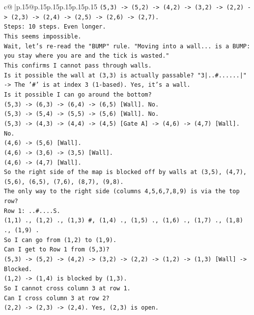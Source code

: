 \documentclass{article}
\begin{document}
{\begin{supertabular}{c@{$\;$}|p{.15\linewidth}@{}p{.15\linewidth}p{.15\linewidth}p{.15\linewidth}p{.15\linewidth}p{.15\linewidth}}
{{{\texttt{(5,3) {-}> (5,2) {-}> (4,2) {-}> (3,2) {-}> (2,2) {-}> (2,3) {-}> (2,4) {-}> (2,5) {-}> (2,6) {-}> (2,7).} \\
\texttt{Steps: 10 steps. Even longer.} \\
\texttt{This seems impossible.} \\
\texttt{Wait, let's re{-}read the "BUMP" rule. "Moving into a wall... is a BUMP: you stay where you are and the tick is wasted."} \\
\texttt{This confirms I cannot pass through walls.} \\
\texttt{Is it possible the wall at (3,3) is actually passable? "3|..\#......|" {-}> The '\#' is at index 3 (1{-}based). Yes, it's a wall.} \\
\texttt{Is it possible I can go around the bottom?} \\
\texttt{(5,3) {-}> (6,3) {-}> (6,4) {-}> (6,5) {[}Wall{]}. No.} \\
\texttt{(5,3) {-}> (5,4) {-}> (5,5) {-}> (5,6) {[}Wall{]}. No.} \\
\texttt{(5,3) {-}> (4,3) {-}> (4,4) {-}> (4,5) {[}Gate A{]} {-}> (4,6) {-}> (4,7) {[}Wall{]}. No.} \\
\texttt{(4,6) {-}> (5,6) {[}Wall{]}.} \\
\texttt{(4,6) {-}> (3,6) {-}> (3,5) {[}Wall{]}.} \\
\texttt{(4,6) {-}> (4,7) {[}Wall{]}.} \\
\texttt{So the right side of the map is blocked off by walls at (3,5), (4,7), (5,6), (6,5), (7,6), (8,7), (9,8).} \\
\texttt{The only way to the right side (columns 4,5,6,7,8,9) is via the top row?} \\
\texttt{Row 1: ..\#....S.} \\
\texttt{(1,1) ., (1,2) ., (1,3) \#, (1,4) ., (1,5) ., (1,6) ., (1,7) ., (1,8) ., (1,9) .} \\
\texttt{So I can go from (1,2) to (1,9).} \\
\texttt{Can I get to Row 1 from (5,3)?} \\
\texttt{(5,3) {-}> (5,2) {-}> (4,2) {-}> (3,2) {-}> (2,2) {-}> (1,2) {-}> (1,3) {[}Wall{]} {-}> Blocked.} \\
\texttt{(1,2) {-}> (1,4) is blocked by (1,3).} \\
\texttt{So I cannot cross column 3 at row 1.} \\
\texttt{Can I cross column 3 at row 2?} \\
\texttt{(2,2) {-}> (2,3) {-}> (2,4). Yes, (2,3) is open.} \\
}}}
\end{supertabular}}
\end{document}
